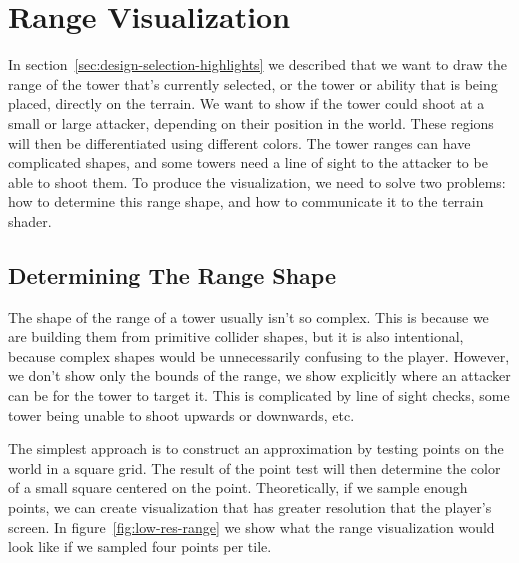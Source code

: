 \section{Range Visualization}\label{sec:analysis-range}

In section~\ref{sec:design-selection-highlights} we described that we want to draw the range of the tower that's currently selected, or the tower or ability that is being placed, directly on the terrain.
We want to show if the tower could shoot at a small or large attacker, depending on their position in the world.
These regions will then be differentiated using different colors.
The tower ranges can have complicated shapes, and some towers need a line of sight to the attacker to be able to shoot them.
To produce the visualization, we need to solve two problems: how to determine this range shape, and how to communicate it to the terrain shader.

\subsection{Determining The Range Shape}

The shape of the range of a tower usually isn't so complex.
This is because we are building them from primitive collider shapes, but it is also intentional, because complex shapes would be unnecessarily confusing to the player.
However, we don't show only the bounds of the range, we show explicitly where an attacker can be for the tower to target it.
This is complicated by line of sight checks, some tower being unable to shoot upwards or downwards, etc.

The simplest approach is to construct an approximation by testing points on the world in a square grid.
The result of the point test will then determine the color of a small square centered on the point.
Theoretically, if we sample enough points, we can create visualization that has greater resolution that the player's screen.
In figure~\ref{fig:low-res-range} we show what the range visualization would look like if we sampled four points per tile.

